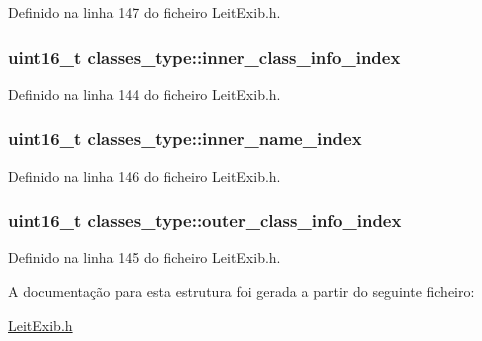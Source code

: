 Definido na linha 147 do ficheiro Leit\-Exib.\-h.

\hypertarget{structclasses__type_a8ee3c154b6031adfa97fccc80d7a76ff}{
\subsubsection[{inner\-\_\-class\-\_\-info\-\_\-index}]{\setlength{\rightskip}{0pt plus 5cm}uint16\-\_\-t classes\-\_\-type\-::inner\-\_\-class\-\_\-info\-\_\-index}}\label{structclasses__type_a8ee3c154b6031adfa97fccc80d7a76ff}


Definido na linha 144 do ficheiro Leit\-Exib.\-h.

\hypertarget{structclasses__type_acd3c408b30a72b1ae22a56fb8642684c}{
\subsubsection[{inner\-\_\-name\-\_\-index}]{\setlength{\rightskip}{0pt plus 5cm}uint16\-\_\-t classes\-\_\-type\-::inner\-\_\-name\-\_\-index}}\label{structclasses__type_acd3c408b30a72b1ae22a56fb8642684c}


Definido na linha 146 do ficheiro Leit\-Exib.\-h.

\hypertarget{structclasses__type_a8a32528b616cd9d1cfc3278e8c942f8f}{
\subsubsection[{outer\-\_\-class\-\_\-info\-\_\-index}]{\setlength{\rightskip}{0pt plus 5cm}uint16\-\_\-t classes\-\_\-type\-::outer\-\_\-class\-\_\-info\-\_\-index}}\label{structclasses__type_a8a32528b616cd9d1cfc3278e8c942f8f}


Definido na linha 145 do ficheiro Leit\-Exib.\-h.



A documentação para esta estrutura foi gerada a partir do seguinte ficheiro\-:\begin{DoxyCompactItemize}
\item 
\hyperlink{_leit_exib_8h}{Leit\-Exib.\-h}\end{DoxyCompactItemize}
